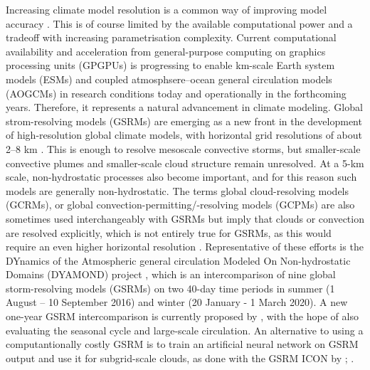 \documentclass[12pt,a4paper]{article}
\begin{document}
Increasing climate model resolution is a common way of improving model accuracy
\citep{mauritsen2022}. This is of course limited by the available computational
power and a tradeoff with increasing parametrisation complexity.  Current
computational availability and acceleration from general-purpose computing on
graphics processing units (GPGPUs) is progressing to enable km-scale Earth
system models (ESMs) and coupled atmosphsere--ocean general circulation models
(AOGCMs) in research conditions today and operationally in the forthcoming
years. Therefore, it represents a natural advancement in climate modeling.
Global strom-resolving models (GSRMs) are emerging as a new front in the
development of high-resolution global climate models, with horizontal grid
resolutions of about 2--8 km \citep{satoh2019,stevens2019}. This is enough to
resolve mesoscale convective storms, but smaller-scale convective plumes and
smaller-scale cloud structure remain unresolved. At a 5-km scale,
non-hydrostatic processes also become important, and for this reason such
models are generally non-hydrostatic. The terms global cloud-resolving models
(GCRMs), or global convection-permitting/-resolving models (GCPMs) are also
sometimes used interchangeably with GSRMs but imply that clouds or convection
are resolved explicitly, which is not entirely true for GSRMs, as this would
require an even higher horizontal resolution \citep{satoh2019}.  Representative
of these efforts is the DYnamics of the Atmospheric general circulation Modeled
On Non-hydrostatic Domains (DYAMOND) project \citep{stevens2019,dyamond}, which
is an intercomparison of nine global storm-resolving models (GSRMs) on two
40-day time periods in summer (1 August -- 10 September 2016) and winter (20
January - 1 March 2020). A new one-year GSRM intercomparison is currently
proposed by \cite{takasuka2024}, with the hope of also evaluating the seasonal
cycle and large-scale circulation.  An alternative to using a
computantionally costly GSRM is to train an artificial neural network on GSRM
output and use it for subgrid-scale clouds, as done with the GSRM ICON by
\cite{grundner2022}; \cite{grundner2023}.
\end{document}
